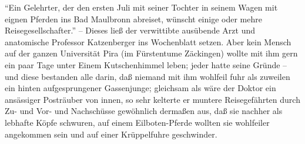 \documentclass[11pt]{book}
\begin{document}
\beginnumbering
\pstart
{}``Ein Gelehrter, der den ersten Juli mit seiner Tochter in seinem Wagen mit eignen Pferden ins Bad Maulbronn abreiset, wünscht einige oder mehre Reisegesellschafter.'' -- Dieses ließ der verwittibte ausübende Arzt und anatomische Professor Katzenberger ins Wochenblatt setzen. Aber kein Mensch auf der ganzen Universität Pira (im Fürstentume Zäckingen) wollte mit ihm gern ein paar Tage unter Einem Kutschenhimmel leben; jeder hatte seine Gründe – und diese bestanden alle darin, daß niemand mit ihm wohlfeil fuhr als zuweilen ein hinten aufgesprungener Gassenjunge; gleichsam als wäre der Doktor ein ansässiger Posträuber von innen, so sehr kelterte er muntere Reisegefährten durch Zu- und Vor- und Nachschüsse gewöhnlich dermaßen aus, daß sie nachher als lebhafte Köpfe schwuren, auf einem Eilboten-Pferde wollten sie wohlfeiler angekommen sein und auf einer Krüppelfuhre geschwinder.
\pend
\endnumbering
\end{document}
